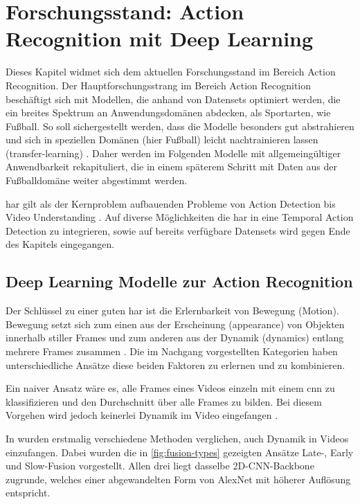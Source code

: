 \label{ch:sota}
\chapter{Forschungsstand: Action Recognition mit Deep Learning}

Dieses Kapitel widmet sich dem aktuellen Forschungsstand im Bereich Action Recognition.
Der Hauptforschungsstrang im Bereich Action Recognition beschäftigt sich mit Modellen, die anhand von Datensets optimiert werden, die ein breites Spektrum an Anwendungsdomänen abdecken, als Sportarten, wie Fußball.
So soll sichergestellt werden, dass die Modelle besonders gut abstrahieren und sich in speziellen Domänen (hier Fußball) leicht nachtrainieren lassen (\gls{transfer-learning}) \cite{Burkov19}.
Daher werden im Folgenden Modelle mit allgemeingültiger Anwendbarkeit rekapituliert, die in einem späterem Schritt mit Daten aus der Fußballdomäne weiter abgestimmt werden.

\gls{har} gilt als der Kernproblem aufbauenden Probleme von Action Detection bis Video Understanding \cite{Jiang19} \cite{Xia20}.
Auf diverse Möglichkeiten die \gls{har} in eine Temporal Action Detection zu integrieren, sowie auf bereits verfügbare Datensets wird gegen Ende des Kapitels eingegangen.

\section{Deep Learning Modelle zur Action Recognition}
\label{sec:deep-learning-modelle-zur-action-recognition}

Der Schlüssel zu einer guten \gls{har} ist die Erlernbarkeit von Bewegung (Motion).
Bewegung setzt sich zum einen aus der Erscheinung (appearance) von Objekten innerhalb stiller Frames und zum anderen aus der Dynamik (dynamics) entlang mehrere Frames zusammen \cite{Sun15} \cite{Wang16}.
Die im Nachgang vorgestellten Kategorien haben unterschiedliche Ansätze diese beiden Faktoren zu erlernen und zu kombinieren.

Ein naiver Ansatz wäre es, alle Frames eines Videos einzeln mit einem \gls{cnn} zu klassifizieren und den Durchschnitt über alle Frames zu bilden.
Bei diesem Vorgehen wird jedoch keinerlei Dynamik im Video eingefangen \cite{Karpathy14}.

In \cite{Karpathy14} wurden erstmalig verschiedene Methoden verglichen, auch Dynamik in Videos einzufangen.
Dabei wurden die in \autoref{fig:fusion-types} gezeigten Ansätze Late-, Early und Slow-Fusion vorgestellt.
Allen drei liegt dasselbe 2D-CNN-Backbone zugrunde, welches einer abgewandelten Form von AlexNet mit höherer Auflösung entspricht.

